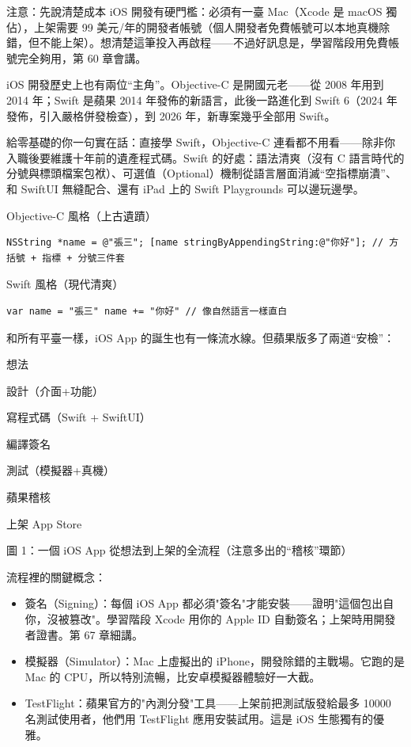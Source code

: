 \begin{tcbwarn}{注意：先說清楚成本}
iOS 開發有硬門檻：必須有一臺 Mac（Xcode 是 macOS 獨佔），上架需要 99 美元/年的開發者帳號（個人開發者免費帳號可以本地真機除錯，但不能上架）。想清楚這筆投入再啟程——不過好訊息是，學習階段用免費帳號完全夠用，第 60 章會講。

\end{tcbwarn}


iOS 開發歷史上也有兩位“主角”。Objective-C 是開國元老——從 2008 年用到 2014 年；Swift 是蘋果 2014 年發佈的新語言，此後一路進化到 Swift 6（2024 年發佈，引入嚴格併發檢查），到 2026 年，新專案幾乎全部用 Swift。

給零基礎的你一句實在話：直接學 Swift，Objective-C 連看都不用看——除非你入職後要維護十年前的遺產程式碼。Swift 的好處：語法清爽（沒有 C 語言時代的分號與標頭檔案包袱）、可選值（Optional）機制從語言層面消滅“空指標崩潰”、和 SwiftUI 無縫配合、還有 iPad 上的 Swift Playgrounds 可以邊玩邊學。

Objective-C 風格（上古遺蹟）

\begin{lstlisting}
NSString *name = @"張三"; [name stringByAppendingString:@"你好"]; // 方括號 + 指標 + 分號三件套
\end{lstlisting}

Swift 風格（現代清爽）

\begin{lstlisting}
var name = "張三" name += "你好" // 像自然語言一樣直白
\end{lstlisting}


和所有平臺一樣，iOS App 的誕生也有一條流水線。但蘋果版多了兩道“安檢”：

想法

設計（介面+功能）

寫程式碼（Swift + SwiftUI）

編譯簽名

測試（模擬器+真機）

蘋果稽核

上架 App Store

\begin{center}\small\color{gray}圖 1：一個 iOS App 從想法到上架的全流程（注意多出的“稽核”環節）\end{center}

流程裡的關鍵概念：

\begin{itemize}
  \item 簽名（Signing）：每個 iOS App 都必須"簽名"才能安裝——證明"這個包出自你，沒被篡改"。學習階段 Xcode 用你的 Apple ID 自動簽名；上架時用開發者證書。第 67 章細講。
  \item 模擬器（Simulator）：Mac 上虛擬出的 iPhone，開發除錯的主戰場。它跑的是 Mac 的 CPU，所以特別流暢，比安卓模擬器體驗好一大截。
  \item TestFlight：蘋果官方的"內測分發"工具——上架前把測試版發給最多 10000 名測試使用者，他們用 TestFlight 應用安裝試用。這是 iOS 生態獨有的優雅。
\end{itemize}

